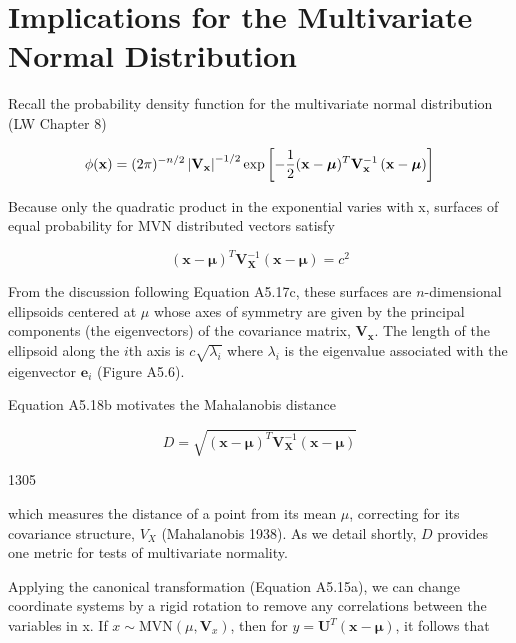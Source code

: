 \documentclass{article}
\begin{document}
\section{Implications for the Multivariate Normal Distribution}
Recall the probability density function for the multivariate normal distribution (LW Chapter 8)

\begin{equation}
\begin{align*}\phi(\mathbf{x})=(2\pi)^{-n/2}\left|\mathbf{V}_{\mathbf{x}}\right|^{-1/2}\exp\left[-{1\over2}(\mathbf{x}-\boldsymbol{\mu})^{T}\mathbf{V}_{\mathbf{x}}^{-1}\left(\mathbf{x}-\boldsymbol{\mu}\right)\right]\end{align*}
\end{equation}

Because only the quadratic product in the exponential varies with x, surfaces of equal probability for MVN distributed vectors satisfy

\begin{equation}
\left(\mathbf{x}-\boldsymbol{\mu}\right)^{T}\mathbf{V}_{\mathbf{X}}^{-1}\left(\mathbf{x}-\boldsymbol{\mu}\right)=c^{2}
\end{equation}

From the discussion following Equation A5.17c, these surfaces are $n$-dimensional ellipsoids centered at $\mu$ whose axes of symmetry are given by the principal components (the eigenvectors) of the covariance matrix, $\mathbf{V}_{\mathbf{x}}$. The length of the ellipsoid along the $i$th axis is $c\sqrt{\lambda_{i}}$ where $\lambda_{i}$ is the eigenvalue associated with the eigenvector $\mathbf{e}_{i}$ (Figure A5.6).

Equation A5.18b motivates the Mahalanobis distance

\begin{equation}
D=\sqrt{\left(\mathbf{x}-\boldsymbol{\mu}\right)^{T}\mathbf{V}_{\mathbf{X}}^{-1}\left(\mathbf{x}-\boldsymbol{\mu}\right)}
\end{equation}

1305

which measures the distance of a point from its mean  $ \mu $, correcting for its covariance structure,  $ V_X $ (Mahalanobis 1938). As we detail shortly,  $ D $ provides one metric for tests of multivariate normality.

Applying the canonical transformation (Equation A5.15a), we can change coordinate systems by a rigid rotation to remove any correlations between the variables in x. If  $ x \sim \text{MVN}(\mu, \mathbf{V}_x) $, then for  $ y = \mathbf{U}^T(\mathbf{x} - \boldsymbol{\mu}) $, it follows that
\end{document}
